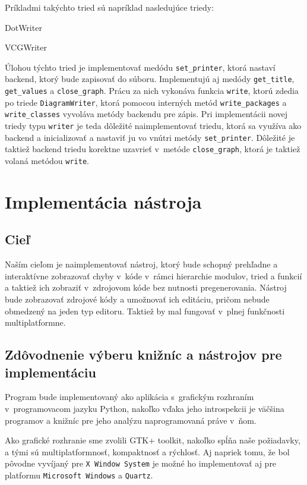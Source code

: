 \documentclass[11pt,oneside,final]{fithesis2}
\begin{document}
			Príkladmi takýchto tried sú napríklad nasledujúce triedy:
			    \begin{list}{•}{}
					\item DotWriter
					\item VCGWriter
    			\end{list}
    			
    	Úlohou týchto tried je implementovať medódu \texttt{set\_printer}, ktorá nastaví backend, ktorý bude zapisovať do súboru.
    	Implementujú aj medódy \texttt{get\_title},  \texttt{get\_values} a \texttt{close\_graph}.
    	Prácu za nich vykonáva funkcia \texttt{write}, ktorú zdedia po triede \texttt{DiagramWriter}, ktorá pomocou interných metód \texttt{write\_packages} a \texttt{write\_classes} vyvoláva metódy backendu pre zápis. Pri implementácii novej triedy typu \texttt{writer} je teda dôležité naimplementovať triedu, ktorá sa využíva ako backend a inicializovať a nastaviť ju vo vnútri metódy \texttt{set\_printer}.
    	Dôležité je taktiež backend triedu korektne uzavrieť v~metóde \texttt{close\_graph}, ktorá je taktiež volaná metódou \texttt{write}.
 
\chapter{Implementácia nástroja}
	\section{Cieľ}
	
	Naším cieľom je naimplementovať nástroj, ktorý bude schopný prehľadne a interaktívne zobrazovať chyby v~kóde v~rámci hierarchie modulov, tried a funkcií a taktiež ich zobraziť v~zdrojovom kóde bez nutnosti pregenerovania. Nástroj bude zobrazovať zdrojové kódy a umožnovať ich editáciu, pričom nebude obmedzený na jeden typ editoru. Taktiež by mal fungovať v~plnej funkčnosti multiplatformne.
	
	\section{Zdôvodnenie výberu knižníc a nástrojov pre implementáciu}
		Program bude implementovaný ako aplikácia s~grafickým rozhraním v~programovacom jazyku Python, nakoľko vďaka jeho introspekcii je väčšina programov a knižníc pre jeho analýzu naprogramovaná práve v~ňom.
		
		Ako grafické rozhranie sme zvolili GTK+ toolkit, nakoľko spĺňa naše požiadavky, a tými sú multiplatformnosť, kompaktnosť a rýchlosť. Aj napriek tomu, že bol pôvodne vyvíjaný pre \texttt{X Window System} je možné ho implementovať aj pre platformu \texttt{Microsoft Windows} a \texttt{Quartz}.
		
\end{document}

